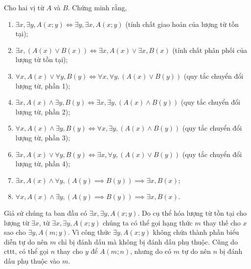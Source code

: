 \exercise Cho hai vị từ $A$ và $B$. Chứng minh rằng, 
\begin{enumerate}
   \item $\exists x, \exists y, A(x; y) \iff \exists y, \exists x, A(x; y)$ (tính chất giao hoán của lượng từ tồn tại);
   \item $\exists x, (A(x) \lor B(x)) \iff \exists x, A(x) \lor \exists x, B(x)$ (tính chất phân phối của lượng từ tồn tại);
   \item $\forall x, A(x) \lor \forall y, B(y) \iff \forall x, \forall y, \left(A(x) \lor B(y)\right)$ (quy tắc chuyển đổi lượng từ, phần 1);
   \item $\exists x, A(x) \land \exists y, B(y) \iff \exists x, \exists y, (A(x) \land B(y))$ (quy tắc chuyển đổi lượng từ, phần 2);
   \item $\forall x, A(x) \land \exists y, B(y) \iff \forall x, \exists y, (A(x) \land B(y))$ (quy tắc chuyển đổi lượng từ, phần 3);
   \item $\exists x, A(x) \lor \forall y, B(y) \iff \exists x, \forall y, (A(x) \lor B(y))$ (quy tắc chuyển đổi lượng từ, phần 4);
   \item $\exists x, A(x) \land \forall y, (A(y) \implies B(y)) \implies \exists x, B(x)$; 
   \item $\forall x, A(x) \land \exists y, (A(y) \implies B(y)) \implies \exists x, B(x)$.
\end{enumerate}

\solution

\resetSubexercise Giả sử chúng ta ban đầu có $\exists x, \exists y, A(x; y)$. Do cụ thể hóa lượng từ tồn tại cho lượng từ $\exists x$, từ $\exists x, \exists y, A(x; y)$ chúng ta có thể gọi hạng thức $m$ thay thế cho $x$ sao cho $\exists y, A(m; y)$. Vì công thức $\exists y, A(x; y)$ không chứa thành phần biểu diễn tự do nên $m$ chỉ bị đánh dấu mà không bị đánh dấu phụ thuộc. Cũng do cttt, có thể gọi $n$ thay cho $y$ để $A(m; n)$, nhưng do có $m$ tự do nên $n$ bị đánh dấu phụ thuộc vào $m$. 

